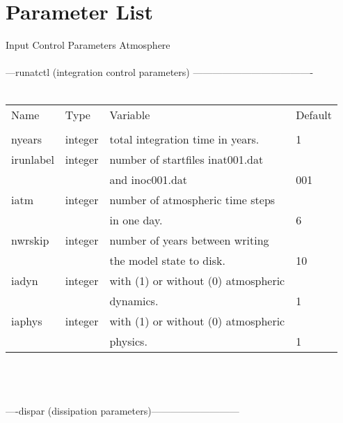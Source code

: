 \baselineskip=14pt

\newpage
\section{Parameter List}


   Input Control Parameters Atmosphere\\ \\
---runatctl  (integration control parameters) -------------------------------------\\ \
\\
\begin{tabular}{llll}
Name	&    Type  &	Variable			&		Default    \\
\\ 
\hline
nyears  &    integer &	total integration time in years.	&	1  \\
irunlabel&   integer &	number of startfiles inat001.dat                   \\
         &           &  and inoc001.dat	                        &	001\\
iatm	&    integer &	number of atmospheric time steps	&	   \\	
        &            &  in one day.			&	6          \\
nwrskip	&    integer &	number of years between writing                   \\ 
        &            &  the model state to disk.            	&	10 \\	
iadyn	&    integer &	with (1) or without (0) atmospheric	&	   \\	
        &            &  dynamics.			&	1          \\
iaphys	&    integer  &	with (1) or without (0) atmospheric  &             \\
	&	&	physics.			&	1          \\  \hline
\end{tabular} \\
\vspace{1.0cm} \\
\\
----dispar  (dissipation parameters)---------------------------    \\
\\
